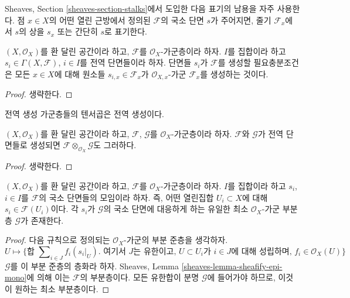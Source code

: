 \noindent
Sheaves, Section \ref{sheaves-section-stalks}에서 도입한 다음 표기의 남용을
자주 사용한다. 점 $x \in X$의 어떤 열린 근방에서 정의된 $\mathcal{F}$의
국소 단면 $s$가 주어지면, 줄기 $\mathcal{F}_x$에서 $s$의 상을 $s_x$ 또는
간단히 $s$로 표기한다.

\begin{lemma}
\label{lemma-globally-generated}
$(X, \mathcal{O}_X)$를 환 달린 공간이라 하고, $\mathcal{F}$를
$\mathcal{O}_X$-가군층이라 하자. $I$를 집합이라 하고
$s_i \in \Gamma(X, \mathcal{F})$, $i \in I$를 전역 단면들이라 하자.
단면들 $s_i$가 $\mathcal{F}$를 생성할 필요충분조건은 모든 $x\in X$에 대해
원소들 $s_{i, x} \in \mathcal{F}_x$가 $\mathcal{O}_{X, x}$-가군
$\mathcal{F}_x$를 생성하는 것이다.
\end{lemma}

\begin{proof}
생략한다.
\end{proof}

\begin{lemma}
\label{lemma-tensor-product-globally-generated}
\begin{slogan}
전역 생성 가군층들의 텐서곱은 전역 생성이다.
\end{slogan}
$(X, \mathcal{O}_X)$를 환 달린 공간이라 하고, $\mathcal{F}$, $\mathcal{G}$를
$\mathcal{O}_X$-가군층이라 하자. $\mathcal{F}$와 $\mathcal{G}$가 전역 단면들로
생성되면 $\mathcal{F} \otimes_{\mathcal{O}_X} \mathcal{G}$도 그러하다.
\end{lemma}

\begin{proof}
생략한다.
\end{proof}

\begin{lemma}
\label{lemma-generated-by-local-sections}
$(X, \mathcal{O}_X)$를 환 달린 공간이라 하고, $\mathcal{F}$를
$\mathcal{O}_X$-가군층이라 하자. $I$를 집합이라 하고 $s_i$, $i \in I$를
$\mathcal{F}$의 국소 단면들의 모임이라 하자. 즉, 어떤 열린집합 $U_i \subset X$에
대해 $s_i \in \mathcal{F}(U_i)$이다. 각 $s_i$가 $\mathcal{G}$의 국소 단면에
대응하게 하는 유일한 최소 $\mathcal{O}_X$-가군 부분층 $\mathcal{G}$가 존재한다.
\end{lemma}

\begin{proof}
다음 규칙으로 정의되는 $\mathcal{O}_X$-가군의 부분 준층을 생각하자.
$$
U
\longmapsto
\{
\text{합 } \sum\nolimits_{i \in J} f_i (s_i|_U)
\text{. 여기서 } J \text{는 유한이고, }
U \subset U_i \text{가 } i\in J \text{에 대해 성립하며, }
f_i \in \mathcal{O}_X(U)
\}
$$
$\mathcal{G}$를 이 부분 준층의 층화라 하자. Sheaves, Lemma
\ref{sheaves-lemma-sheafify-epi-mono}에 의해 이는 $\mathcal{F}$의 부분층이다.
모든 유한합이 분명 $\mathcal{G}$에 들어가야 하므로, 이것이 원하는 최소 부분층이다.
\end{proof}

